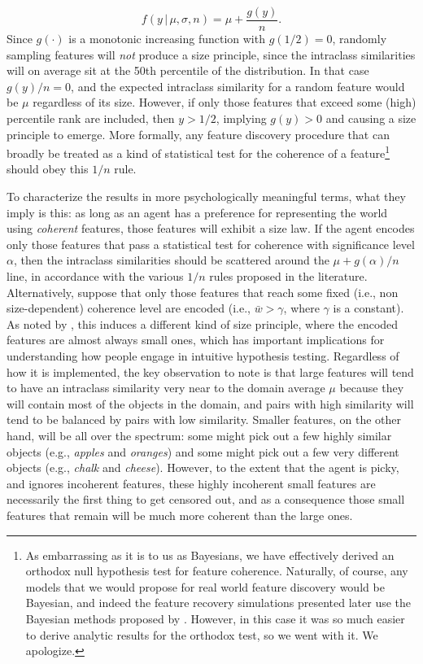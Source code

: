 \documentclass{apa}
\newcommand{\given}{\,|\,}
\newcommand{\exemplar}[1]{\textit{#1}}
\begin{document}
\begin{equation}
f(y\given \mu,\sigma,n) = \mu + \frac{g(y)}{n}.
\end{equation}
\noindent
Since $g(\cdot)$ is a monotonic increasing function with $g(1/2)=0$, randomly sampling features will {\it not} produce a size principle, since the intraclass similarities will on average sit at the 50th percentile of the distribution. In that case $g(y)/n=0$, and the expected intraclass similarity for a random feature would be $\mu$ regardless of its size. However, if only those features that exceed some (high) percentile rank are included, then $y>1/2$, implying $g(y)>0$ and causing a size principle to emerge. More formally, any feature discovery procedure that can broadly be treated as a kind of statistical test for the coherence of a feature\footnote{As embarrassing as it is to us as Bayesians, we have effectively derived an orthodox null hypothesis test for feature coherence. Naturally, of course, any models that we would propose for real world feature discovery would be Bayesian, and indeed the feature recovery simulations presented later use the Bayesian methods proposed by . However, in this case it was so much easier to derive analytic results for the orthodox test, so we went with it. We apologize.} should obey this $1/n$ rule.

To characterize the results in more psychologically meaningful terms, what they imply is this: as long as an agent has a preference for representing the world using {\it coherent} features, those features will exhibit a size law. If the agent encodes only those features that pass a statistical test for coherence with significance level $\alpha$, then the intraclass similarities should be scattered around the $\mu + g(\alpha)/n$ line, in accordance with the various $1/n$ rules proposed in the literature. Alternatively, suppose that only those features that reach some fixed (i.e., non size-dependent) coherence level are encoded (i.e., $\bar{w}>\gamma$, where $\gamma$ is a constant). As noted by , this induces a different kind of size principle, where the encoded features are almost always small ones, which has important implications for understanding how people engage in intuitive hypothesis testing. Regardless of how it is implemented, the key observation to note is that large features will tend to have an intraclass similarity very near to the domain average $\mu$ because they will contain most of the objects in the domain, and pairs with high similarity will tend to be balanced by pairs with low similarity. Smaller features, on the other hand, will be all over the spectrum: some might pick out a few highly similar objects (e.g., \exemplar{apples} and \exemplar{oranges}) and some might pick out a few very different objects (e.g., \exemplar{chalk} and \exemplar{cheese}). However, to the extent that the agent is picky, and ignores incoherent features, these highly incoherent small features are necessarily the first thing to get censored out, and as a consequence those small features that remain will be much more coherent than the large ones.
\end{document}
